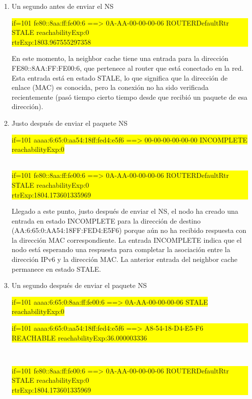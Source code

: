 \begin{enumerate}
    \item Un segundo antes de enviar el NS
    
    \colorbox{yellow}{%
        \parbox{\linewidth}{%
            if=101 fe80::8aa:ff:fe00:6 ==> 0A-AA-00-00-00-06 ROUTERDefaultRtr STALE reachabilityExp:0\\
            rtrExp:1803.967555297358%
        }
    }

    En este momento, la neighbor cache tiene una entrada para la dirección FE80::8AA:FF:FE00:6, que pertenece al router que está conectado en la red. Esta entrada está en estado STALE, lo que significa que la dirección de enlace (MAC) es conocida, pero la conexión no ha sido verificada recientemente (pasó tiempo cierto tiempo desde que recibió un paquete de esa dirección).

    \item Justo después de enviar el paquete NS
    
    \colorbox{yellow}{%
            if=101 aaaa:6:65:0:aa54:18ff:fed4:e5f6 ==> 00-00-00-00-00-00 INCOMPLETE reachabilityExp:0\\
    }\\
    \colorbox{yellow}{%
        \parbox{\linewidth}{%
            if=101 fe80::8aa:ff:fe00:6 ==> 0A-AA-00-00-00-06 ROUTERDefaultRtr STALE reachabilityExp:0\\
            rtrExp:1804.173601335969%
        }
    }

    Llegado a este punto, justo después de enviar el NS, el nodo ha creado una entrada en estado INCOMPLETE para la dirección de destino (AA:6:65:0:AA54:18FF:FED4:E5F6) porque aún no ha recibido respuesta con la dirección MAC correspondiente. La entrada INCOMPLETE indica que el nodo está esperando una respuesta para completar la asociación entre la dirección IPv6 y la dirección MAC. La anterior entrada del neighbor cache permanece en estado STALE.

    \item Un segundo después de enviar el paquete NS
    
    \colorbox{yellow}{%
            if=101 aaaa:6:65:0:8aa:ff:fe00:6 ==> 0A-AA-00-00-00-06 STALE reachabilityExp:0%
    }\\
    \colorbox{yellow}{%
        \parbox{\linewidth}{%
            if=101 aaaa:6:65:0:aa54:18ff:fed4:e5f6 ==> A8-54-18-D4-E5-F6 REACHABLE reachabilityExp:36.000003336%
        }
    }\\
    \colorbox{yellow}{%
        \parbox{\linewidth}{%
            if=101 fe80::8aa:ff:fe00:6 ==> 0A-AA-00-00-00-06 ROUTERDefaultRtr STALE reachabilityExp:0\\
            rtrExp:1804.173601335969%
        }
    }


\end{enumerate}

